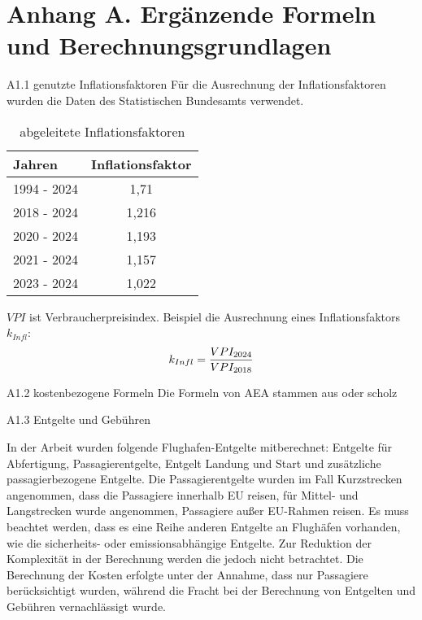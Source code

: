 \chapter{Anhang A. Ergänzende Formeln und Berechnungsgrundlagen}
A1.1 genutzte Inflationsfaktoren
Für die Ausrechnung der Inflationsfaktoren wurden die Daten des Statistischen Bundesamts verwendet. 
\begin{table}[h]
	\begin{center}
    \caption{abgeleitete Inflationsfaktoren}
	\label{Inflationsfaktoren}
	\begin{tabular}{|l|c|}
		\hline
		Jahren & \textbf{Inflationsfaktor} \\ \hline
		1994 - 2024 & 1,71 \\ \hline
		2018 - 2024 & 1,216 \\ \hline
		2020 - 2024 & 1,193 \\ \hline
        2021 - 2024 & 1,157 \\ \hline
        2023 - 2024 & 1,022 \\ \hline
	\end{tabular}
    \end{center}
\end{table}

$VPI$ ist Verbraucherpreisindex. Beispiel die Ausrechnung eines Inflationsfaktors $k_{Infl}$:
\begin{equation}
	{k_{Infl}} = \frac{VPI_{2024}}{VPI_{2018}} \\
	\label{inflation}
 \end{equation}

A1.2 kostenbezogene Formeln
Die Formeln von AEA stammen aus \cite{minwoo2019analysis} oder scholz

A1.3 Entgelte und Gebühren

In der Arbeit wurden folgende Flughafen-Entgelte mitberechnet: Entgelte für Abfertigung, 
Passagierentgelte, Entgelt Landung und Start
und zusätzliche passagierbezogene Entgelte. Die Passagierentgelte wurden im Fall Kurzstrecken angenommen,
dass die Passagiere innerhalb EU reisen, für Mittel- und Langstrecken wurde angenommen, 
Passagiere außer EU-Rahmen reisen.
Es muss beachtet werden, dass es eine Reihe anderen Entgelte an Flughäfen vorhanden, 
wie die sicherheits- oder emissionsabhängige Entgelte. Zur Reduktion der Komplexität in der Berechnung werden die jedoch nicht betrachtet.
Die Berechnung der Kosten erfolgte unter der Annahme, dass nur Passagiere berücksichtigt wurden, 
während die Fracht bei der Berechnung von Entgelten und Gebühren vernachlässigt wurde.

